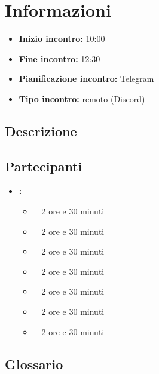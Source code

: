 \section{Informazioni}
\begin{itemize}
	\item \textbf{Inizio incontro:} 10:00
	\item \textbf{Fine incontro:} 12:30
	\item \textbf{Pianificazione incontro:} Telegram
	\item \textbf{Tipo incontro:} remoto (Discord)
\end{itemize}

\subsection{Descrizione}
\DocDescription

\subsection{Partecipanti}

\begin{itemize}
	\item \textbf{\GroupName:}
	\begin{itemize}
		\item \tommaso \ \rightarrow\ 2 ore e 30 minuti
		\item \marco \ \rightarrow\ 2 ore e 30 minuti
		\item \riccardo \ \rightarrow\ 2 ore e 30 minuti
		\item \raul \ \rightarrow\ 2 ore e 30 minuti
		\item \martina \ \rightarrow\ 2 ore e 30 minuti
		\item \sebastiano \ \rightarrow\ 2 ore e 30 minuti
		\item \mattia \ \rightarrow\ 2 ore e 30 minuti
	\end{itemize}
\end{itemize}

\subsection{Glossario}
\GlossarioIntroduzione

\clearpage